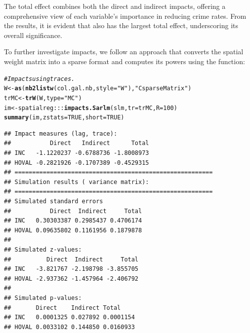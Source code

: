 \documentclass[english,12pt]{book}\usepackage[]{graphicx}\usepackage[]{xcolor}
\makeatletter
\newcommand{\hlnum}[1]{\textcolor[rgb]{0.686,0.059,0.569}{#1}}%
\newcommand{\hlsng}[1]{\textcolor[rgb]{0.192,0.494,0.8}{#1}}%
\newcommand{\hlcom}[1]{\textcolor[rgb]{0.678,0.584,0.686}{\textit{#1}}}%
\newcommand{\hlopt}[1]{\textcolor[rgb]{0,0,0}{#1}}%
\newcommand{\hldef}[1]{\textcolor[rgb]{0.345,0.345,0.345}{#1}}%
\newcommand{\hlkwb}[1]{\textcolor[rgb]{0.69,0.353,0.396}{#1}}%
\newcommand{\hlkwc}[1]{\textcolor[rgb]{0.333,0.667,0.333}{#1}}%
\newcommand{\hlkwd}[1]{\textcolor[rgb]{0.737,0.353,0.396}{\textbf{#1}}}%
\newenvironment{kframe}{%
 \def\at@end@of@kframe{}%
 \ifinner\ifhmode%
  \def\at@end@of@kframe{\end{minipage}}%
  \begin{minipage}{\columnwidth}%
 \fi\fi%
 \def\FrameCommand##1{\hskip\@totalleftmargin \hskip-\fboxsep
 \colorbox{shadecolor}{##1}\hskip-\fboxsep
     \hskip-\linewidth \hskip-\@totalleftmargin \hskip\columnwidth}%
 \MakeFramed {\advance\hsize-\width
   \@totalleftmargin\z@ \linewidth\hsize
   \@setminipage}}%
 {\par\unskip\endMakeFramed%
 \at@end@of@kframe}
\newenvironment{knitrout}{}{} %
\makeatother
\begin{document}
The total effect combines both the direct and indirect impacts, offering a comprehensive view of each variable’s importance in reducing crime rates. From the results, it is evident that  also has the largest total effect, underscoring its overall significance.

To further investigate impacts, we follow an approach that converts the spatial weight matrix into a sparse format and computes its powers using the  function:
\begin{knitrout}
\color{fgcolor}\begin{kframe}
\begin{alltt}
\hlcom{# Impacts using traces. }
\hldef{W} \hlkwb{<-} \hlkwd{as}\hldef{(}\hlkwd{nb2listw}\hldef{(col.gal.nb,} \hlkwc{style} \hldef{=} \hlsng{"W"}\hldef{),} \hlsng{"CsparseMatrix"}\hldef{)}
\hldef{trMC} \hlkwb{<-} \hlkwd{trW}\hldef{(W,} \hlkwc{type} \hldef{=} \hlsng{"MC"}\hldef{)}
\hldef{im} \hlkwb{<-} \hldef{spatialreg}\hlopt{:::}\hlkwd{impacts.Sarlm}\hldef{(slm,} \hlkwc{tr} \hldef{= trMC,} \hlkwc{R} \hldef{=} \hlnum{100}\hldef{)}
\hlkwd{summary}\hldef{(im,} \hlkwc{zstats} \hldef{=}  \hlnum{TRUE}\hldef{,} \hlkwc{short} \hldef{=} \hlnum{TRUE}\hldef{)}
\end{alltt}
\begin{verbatim}
## Impact measures (lag, trace):
##           Direct   Indirect      Total
## INC   -1.1220237 -0.6788736 -1.8008973
## HOVAL -0.2821926 -0.1707389 -0.4529315
## ========================================================
## Simulation results ( variance matrix):
## ========================================================
## Simulated standard errors
##           Direct  Indirect     Total
## INC   0.30303387 0.2985437 0.4706174
## HOVAL 0.09635802 0.1161956 0.1879878
## 
## Simulated z-values:
##          Direct  Indirect     Total
## INC   -3.821767 -2.198798 -3.855705
## HOVAL -2.937362 -1.457964 -2.406792
## 
## Simulated p-values:
##       Direct    Indirect Total    
## INC   0.0001325 0.027892 0.0001154
## HOVAL 0.0033102 0.144850 0.0160933
\end{verbatim}
\end{kframe}
\end{knitrout}
\end{document}
